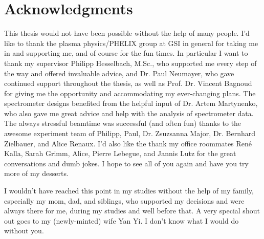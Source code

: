 \chapter*{Acknowledgments}

This thesis would not have been possible without the help of many people. I'd like to thank the plasma physics/PHELIX group at GSI in general for taking me in and supporting me, and of course for the fun times. In particular I want to thank my supervisor Philipp Hesselbach, M.Sc., who supported me every step of the way and offered invaluable advice, and Dr. Paul Neumayer, who gave continued support throughout the thesis, as well as Prof. Dr. Vincent Bagnoud for giving me the opportunity and accommodating my ever-changing plans. The spectrometer designs benefited from the helpful input of Dr. Artem Martynenko, who also gave me great advice and help with the analysis of spectrometer data. The always stressful beamtime was successful (and often fun) thanks to the awesome experiment team of Philipp, Paul, Dr. Zsuzsanna Major, Dr. Bernhard Zielbauer, and Alice Renaux. I'd also like the thank my office roommates René Kalla, Sarah Grimm, Alice, Pierre Lebegue, and Jannis Lutz for the great conversations and dumb jokes. I hope to see all of you again and have you try more of my desserts.

I wouldn't have reached this point in my studies without the help of my family, especially my mom, dad, and siblings, who supported my decisions and were always there for me, during my studies and well before that. A very special shout out goes to my (newly-minted) wife Yan Yi. I don't know what I would do without you.

